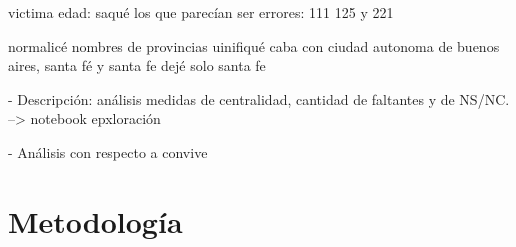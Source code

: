 \documentclass[10 pt]{article}
\begin{document}
victima edad: saqué los que parecían ser errores:  111 125 y 221

normalicé nombres de provincias uinifiqué caba con ciudad autonoma de buenos aires, santa fé y santa fe dejé solo santa fe




- Descripción: análisis medidas de centralidad, cantidad de faltantes y de NS/NC. --> notebook epxloración




- Análisis con respecto a convive




\section{Metodología}\label{met}
\end{document}
